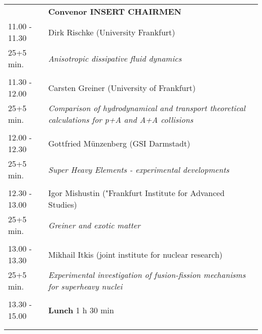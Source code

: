 \begin{longtable}{p{3cm}p{13cm}}
&\hfill {\bf Convenor INSERT CHAIRMEN }\\ 
11.00 - 11.30 & Dirk Rischke (University Frankfurt)\\ 
25+5 min. & {\it Anisotropic dissipative fluid dynamics}\\ 
 & \\ 
11.30 - 12.00 & Carsten Greiner (University of Frankfurt)\\ 
25+5 min. & {\it Comparison of hydrodynamical and transport theoretical calculations for p+A and A+A collisions}\\ 
 & \\ 
12.00 - 12.30 & Gottfried Münzenberg (GSI Darmstadt)\\ 
25+5 min. & {\it Super Heavy Elements -  experimental developments}\\ 
 & \\ 
12.30 - 13.00 & Igor Mishustin ("Frankfurt Institute for Advanced Studies)\\ 
25+5 min. & {\it Greiner and exotic matter}\\ 
 & \\ 
13.00 - 13.30 & Mikhail Itkis (joint institute for nuclear research)\\ 
25+5 min. & {\it Experimental investigation of fusion-fission mechanisms for superheavy nuclei}\\ 
 & \\ 
13.30 - 15.00 & {\bf Lunch} \hfill 1 h 30 min \\ 
 & \\ 
 & \\ 
\end{longtable}


